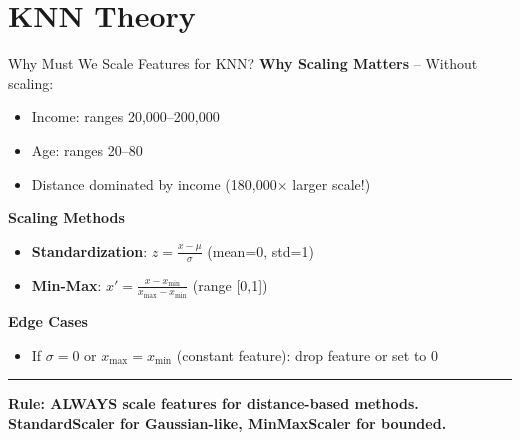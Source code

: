 \documentclass[8pt,aspectratio=169]{beamer}
\newcommand{\bottomnote}[1]{%
\vfill
\vspace{-2mm}
\textcolor{mllavender2}{\rule{\textwidth}{0.4pt}}
\vspace{1mm}
\footnotesize
\textbf{#1}
}
\newenvironment{compactlist}{%
  \begin{itemize}%
    \setlength{\itemsep}{2pt}%
    \setlength{\parskip}{0pt}%
    \setlength{\parsep}{0pt}%
}{%
  \end{itemize}%
}
\begin{document}
\section{KNN Theory}

\begin{frame}[t]{Why Must We Scale Features for KNN?}
\textbf{Why Scaling Matters} -- Without scaling:
\begin{itemize}
\item Income: ranges 20,000--200,000
\item Age: ranges 20--80
\item Distance dominated by income (180,000$\times$ larger scale!)
\end{itemize}
\vspace{0.5em}
\textbf{Scaling Methods}
\begin{compactlist}
\item \textbf{Standardization}: $z = \frac{x - \mu}{\sigma}$ \quad (mean=0, std=1)
\item \textbf{Min-Max}: $x' = \frac{x - x_{\min}}{x_{\max} - x_{\min}}$ \quad (range [0,1])
\end{compactlist}
\vspace{0.3em}
\textbf{Edge Cases}
\begin{itemize}
\item If $\sigma = 0$ or $x_{\max} = x_{\min}$ (constant feature): drop feature or set to 0
\end{itemize}
\bottomnote{Rule: ALWAYS scale features for distance-based methods. StandardScaler for Gaussian-like, MinMaxScaler for bounded.}
\end{frame}
\end{document}
